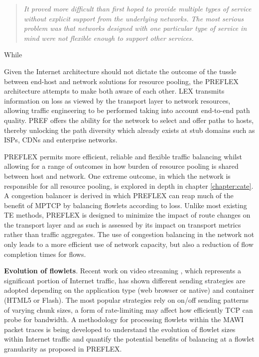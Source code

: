 \begin{quote}
\textit{It proved more difficult than first hoped to provide multiple types of service without explicit support from the underlying networks. The most serious problem was that networks designed with one particular type of service in mind were not flexible enough to support other services.}
\end{quote}
While







Given the Internet architecture should not dictate the outcome of the tussle between end-host and network solutions for resource pooling, the \ac{PREFLEX} architecture attempts to make both aware of each other.
\acf{LEX} transmits information on loss as viewed by the transport layer to network resources, allowing traffic engineering to be performed taking into account end-to-end path quality.
\acf{PREF} offers the ability for the network to select and offer paths to hosts, thereby unlocking the path diversity which already exists at stub domains such as \acp{ISP}, \acp{CDN} and enterprise networks.

\ac{PREFLEX} permits more efficient, reliable and flexible traffic balancing whilst allowing for a range of outcomes in how burden of resource pooling is shared between host and network.
One extreme outcome, in which the network is responsible for all resource pooling, is explored in depth in chapter \ref{chapter:cate}.
A congestion balancer is derived in which \ac{PREFLEX} can reap much of the benefit of \ac{MPTCP} by balancing flowlets according to loss.
Unlike most existing \ac{TE} methods, \ac{PREFLEX} is designed to minimize the impact of route changes on the transport layer and as such is assessed by its impact on transport metrics rather than traffic aggregates.
The use of congestion balancing in the network not only leads to a more efficient use of network capacity, but also a reduction of flow completion times for flows.

    \textbf{Evolution of flowlets}. Recent work on video streaming \cite{Rao:2011p547} , which represents a significant portion of Internet traffic, 
    has shown different sending strategies are adopted depending on the application type (web browser or native) and container (HTML5 or Flash).
    The most popular strategies rely on on/off sending patterns of varying chunk sizes, a form of rate-limiting may affect how efficiently \ac{TCP} can probe for bandwidth.
    A methodology for processing flowlets within the \ac{MAWI} packet traces is being developed to understand the evolution of flowlet sizes within Internet traffic and quantify the potential benefits of balancing at a flowlet granularity as proposed in \ac{PREFLEX}.

